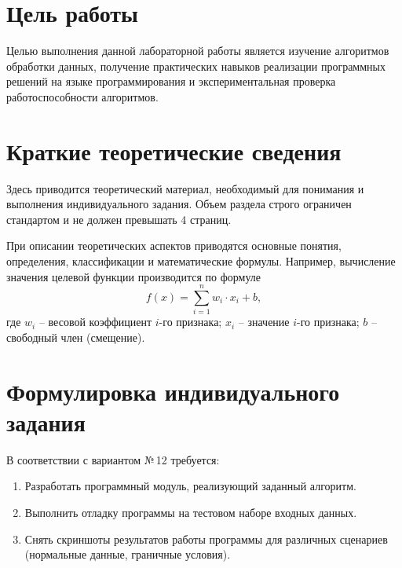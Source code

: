 \documentclass[14pt,a4paper]{extarticle}
\begin{document}
\makestptitlepage

\clearpage
\section{Цель работы}
Целью выполнения данной лабораторной работы является изучение алгоритмов обработки данных, получение практических навыков реализации программных решений на языке программирования и экспериментальная проверка работоспособности алгоритмов.

\clearpage
\section{Краткие теоретические сведения}
Здесь приводится теоретический материал, необходимый для понимания и выполнения индивидуального задания. Объем раздела строго ограничен стандартом и не должен превышать 4 страниц.

При описании теоретических аспектов приводятся основные понятия, определения, классификации и математические формулы. Например, вычисление значения целевой функции производится по формуле
\begin{equation}
  f(x) = \sum_{i=1}^{n} w_i \cdot x_i + b,
\end{equation}
где $w_i$ -- весовой коэффициент $i$-го признака;
$x_i$ -- значение $i$-го признака;
$b$ -- свободный член (смещение).

\clearpage
\section{Формулировка индивидуального задания}
В соответствии с вариантом №\,12 требуется:
\begin{enumerate}
  \item Разработать программный модуль, реализующий заданный алгоритм.
  \item Выполнить отладку программы на тестовом наборе входных данных.
  \item Снять скриншоты результатов работы программы для различных сценариев (нормальные данные, граничные условия).
\end{enumerate}
\end{document}
